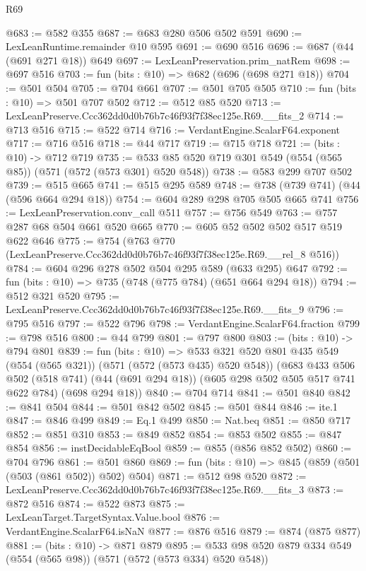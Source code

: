 \begin{lexlean}{R69}
\begin{coremodule}
@683 := @582 @355
@687 := @683 @280 @506 @502 @591
@690 := LexLeanRuntime.remainder @10 @595
@691 := @690 @516
@696 := @687 (@44 (@691 @271 @18)) @649
@697 := LexLeanPreservation.prim_natRem
@698 := @697 @516
@703 := fun (bits : @10) => @682 (@696 (@698 @271 @18))
@704 := @501 @504
@705 := @704 @661
@707 := @501 @705 @505
@710 := fun (bits : @10) => @501 @707 @502
@712 := @512 @85 @520
@713 := LexLeanPreserve.Ccc362dd0d0b76b7c46f93f7f38ec125e.R69.__fits_2
@714 := @713 @516
@715 := @522 @714
@716 := VerdantEngine.ScalarF64.exponent
@717 := @716 @516
@718 := @44 @717
@719 := @715 @718
@721 := (bits : @10) -> @712 @719
@735 := @533 @85 @520 @719 @301 @549 (@554 (@565 @85)) (@571 (@572 (@573 @301) @520 @548))
@738 := @583 @299 @707 @502
@739 := @515 @665
@741 := @515 @295 @589
@748 := @738 (@739 @741) (@44 (@596 @664 @294 @18))
@754 := @604 @289 @298 @705 @505 @665 @741
@756 := LexLeanPreservation.conv_call @511
@757 := @756 @549
@763 := @757 @287 @68 @504 @661 @520 @665
@770 := @605 @52 @502 @502 @517 @519 @622 @646
@775 := @754 (@763 @770 (LexLeanPreserve.Ccc362dd0d0b76b7c46f93f7f38ec125e.R69.__rel_8 @516))
@784 := @604 @296 @278 @502 @504 @295 @589 (@633 @295) @647
@792 := fun (bits : @10) => @735 (@748 (@775 @784) (@651 @664 @294 @18))
@794 := @512 @321 @520
@795 := LexLeanPreserve.Ccc362dd0d0b76b7c46f93f7f38ec125e.R69.__fits_9
@796 := @795 @516
@797 := @522 @796
@798 := VerdantEngine.ScalarF64.fraction
@799 := @798 @516
@800 := @44 @799
@801 := @797 @800
@803 := (bits : @10) -> @794 @801
@839 := fun (bits : @10) =>
  @533
    @321
    @520
    @801
    @435
    @549
    (@554 (@565 @321))
    (@571 (@572 (@573 @435) @520 @548))
    (@683
      @433
      @506
      @502
      (@518 @741)
      (@44 (@691 @294 @18))
      (@605 @298 @502 @505 @517 @741 @622 @784)
      (@698 @294 @18))
@840 := @704 @714
@841 := @501 @840
@842 := @841 @504
@844 := @501 @842 @502
@845 := @501 @844
@846 := ite.{1}
@847 := @846 @499
@849 := Eq.{1} @499
@850 := Nat.beq
@851 := @850 @717
@852 := @851 @310
@853 := @849 @852
@854 := @853 @502
@855 := @847 @854
@856 := instDecidableEqBool
@859 := @855 (@856 @852 @502)
@860 := @704 @796
@861 := @501 @860
@869 := fun (bits : @10) => @845 (@859 (@501 (@503 (@861 @502)) @502) @504)
@871 := @512 @98 @520
@872 := LexLeanPreserve.Ccc362dd0d0b76b7c46f93f7f38ec125e.R69.__fits_3
@873 := @872 @516
@874 := @522 @873
@875 := LexLeanTarget.TargetSyntax.Value.bool
@876 := VerdantEngine.ScalarF64.isNaN
@877 := @876 @516
@879 := @874 (@875 @877)
@881 := (bits : @10) -> @871 @879
@895 := @533 @98 @520 @879 @334 @549 (@554 (@565 @98)) (@571 (@572 (@573 @334) @520 @548))

\end{coremodule}
\end{lexlean}

